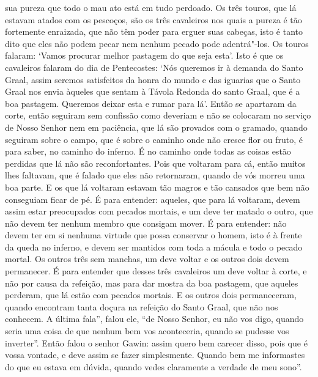 sua pureza que todo o mau ato está em tudo perdoado. Os três touros, que lá
estavam atados com os pescoços, são os três cavaleiros nos quais a pureza é tão
fortemente enraizada, que não têm poder para erguer suas cabeças, isto é tanto
dito que eles não podem pecar nem nenhum pecado pode adentrá"-los. Os touros
falaram: ‘Vamos procurar melhor pastagem do que seja esta’. Isto é que os
cavaleiros falaram do dia de Pentecostes: ‘Nós queremos ir à demanda do Santo
Graal, assim seremos satisfeitos da honra do mundo e das iguarias que o Santo
Graal nos envia àqueles que sentam à Távola Redonda do santo Graal, que é a boa
pastagem. Queremos deixar esta e rumar para lá’. Então se apartaram da corte,
então seguiram sem confissão como deveriam e não se colocaram no serviço de
Nosso Senhor nem em paciência, que lá são provados com o gramado, quando
seguiram sobre o campo, que é sobre o caminho onde não cresce flor ou fruto, é
para saber, no caminho do inferno. É no caminho onde todas as coisas estão
perdidas que lá não são reconfortantes. Pois que voltaram para cá, então muitos
lhes faltavam, que é falado que eles não retornaram, quando de vós morreu uma
boa parte. E os que lá voltaram estavam tão magros e tão cansados que bem não
conseguiam ficar de pé. É para entender: aqueles, que para lá voltaram, devem
assim estar preocupados com pecados mortais, e um deve ter matado o outro, que
não devem ter nenhum membro que consigam mover. É para entender: não devem ter
em si nenhuma virtude que possa conservar o homem, isto é à frente da queda no
inferno, e devem ser mantidos com toda a mácula e todo o pecado mortal. Os
outros três sem manchas, um deve voltar e os outros dois devem permanecer. É
para entender que desses três cavaleiros um deve voltar à corte, e não por causa
da refeição, mas para dar mostra da boa pastagem, que aqueles perderam, que lá
estão com pecados mortais. E os outros dois permaneceram, quando encontram
tanta doçura na refeição do Santo Graal, que não nos conhecem. A última fala”,
falou ele, “de Nosso Senhor,  eu não vos digo, quando seria uma coisa de que
nenhum bem vos aconteceria, quando se pudesse vos inverter”. Então falou o
senhor Gawin: assim quero bem carecer disso, pois que é vossa vontade, e deve
assim se fazer simplesmente. Quando bem me informastes do que eu estava em
dúvida, quando vedes claramente a verdade de meu sono”. 

